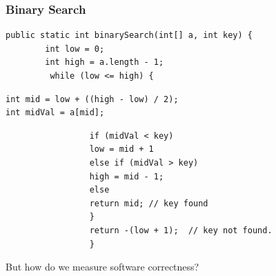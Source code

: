 \documentclass{beamer}
\begin{document}
\begin{frame} [fragile]
        \frametitle{Binary Search}

        \center
\begin{lstlisting}
public static int binarySearch(int[] a, int key) {
        int low = 0;
        int high = a.length - 1;
         while (low <= high) {
\end{lstlisting}
\vspace{-\baselineskip}
\begin{lstlisting}[backgroundcolor=\color{green}]
int mid = low + ((high - low) / 2); 
int midVal = a[mid]; 
\end{lstlisting}
\vspace{-\baselineskip}
\begin{lstlisting}
                 if (midVal < key)
                 low = mid + 1
                 else if (midVal > key)
                 high = mid - 1;
                 else
                 return mid; // key found
                 }
                 return -(low + 1);  // key not found.
                 }

\end{lstlisting}
\end{frame}

\begin{frame}
 \begin{center}
                But how do we measure software correctness?
        \end{center}

\end{frame}

\end{document}
